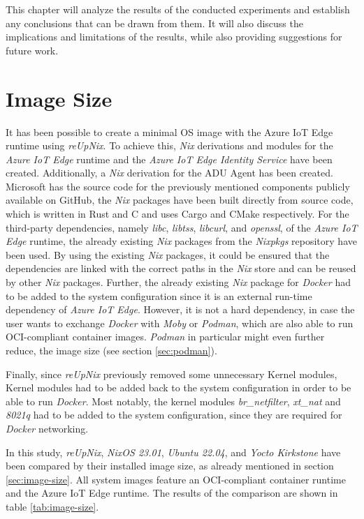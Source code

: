 This chapter will analyze the results of the conducted experiments and establish
any conclusions that can be drawn from them. It will also discuss the implications
and limitations of the results, while also providing suggestions for future work.

\section{Image Size}
It has been possible to create a minimal \ac{OS} image with the Azure IoT Edge runtime
using \textit{reUpNix}. To achieve this, \textit{Nix} derivations and modules for
the \textit{Azure IoT Edge} runtime and the \textit{Azure IoT Edge Identity Service}
have been created. Additionally, a \textit{Nix} derivation for the \ac{ADU} Agent has been created.
Microsoft has the source code for the previously mentioned components
publicly available on GitHub, the \textit{Nix} packages have been built directly
from source code, which is written in Rust and C and uses Cargo and CMake respectively.
For the third-party dependencies, namely \textit{libc}, \textit{libtss}, \textit{libcurl}, and
\textit{openssl}, of the \textit{Azure IoT Edge} runtime, the already existing \textit{Nix} packages
from the \textit{Nixpkgs} repository have been used.
By using the existing \textit{Nix} packages, it could be ensured that the dependencies
are linked with the correct paths in the \textit{Nix} store and can be reused
by other \textit{Nix} packages.
Further, the already existing \textit{Nix} package for \textit{Docker} had to be added
to the system configuration since it is an external run-time dependency of \textit{Azure IoT Edge}.
However, it is not a hard dependency, in case the user wants to exchange \textit{Docker}
with \textit{Moby} or \textit{Podman}, which are also able to run \ac{OCI}-compliant
container images. \textit{Podman} in particular might even further reduce, the
image size (see section \ref{sec:podman}).

Finally, since \textit{reUpNix} previously removed some unnecessary
Kernel modules, Kernel modules had to be added back to the system configuration in order
to be able to run \textit{Docker}.
Most notably, the kernel modules
\textit{br\_netfilter}, \textit{xt\_nat} and \textit{8021q} had to be added to the system configuration,
since they are required for \textit{Docker} networking.

In this study,
\textit{reUpNix}, \textit{NixOS 23.01}, \textit{Ubuntu 22.04}, and
\textit{Yocto Kirkstone} have been compared by their installed image size, as
already mentioned in section \ref{sec:image-size}. All system images feature
an \ac{OCI}-compliant container runtime
and the Azure IoT Edge runtime. The results of the comparison are
shown in table \ref{tab:image-size}.


